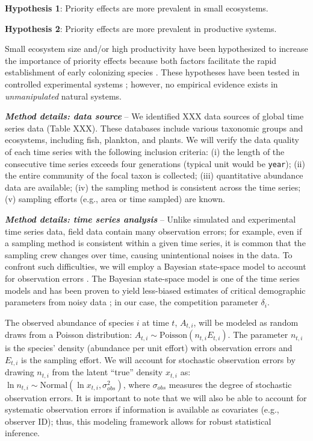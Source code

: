 \documentclass[12pt, class=article, crop=false]{standalone}
\begin{document}
\textbf{Hypothesis 1}: Priority effects are more prevalent in small ecosystems.

\textbf{Hypothesis 2}: Priority effects are more prevalent in productive systems.

Small ecosystem size and/or high productivity have been hypothesized to increase the importance of priority effects because both factors facilitate the rapid establishment of early colonizing species \citep{fukami_historical_2015}.
These hypotheses have been tested in controlled experimental systems \citep{fukami_assembly_2004, chase_stochastic_2010}; however, no empirical evidence exists in \textit{unmanipulated} natural systems.

\textit{\textbf{Method details: data source}} --
We identified XXX data sources of global time series data (Table XXX).
These databases include various taxonomic groups and ecosystems, including fish, plankton, and plants.
We will verify the data quality of each time series with the following inclusion criteria: (i) the length of the consecutive time series exceeds four generations (typical unit would be \texttt{year}); (ii) the entire community of the focal taxon is collected; (iii) quantitative abundance data are available; (iv) the sampling method is consistent across the time series; (v) sampling efforts (e.g., area or time sampled) are known.

\textit{\textbf{Method details: time series analysis}} --
Unlike simulated and experimental time series data, field data contain many observation errors; for example, even if a sampling method is consistent within a given time series, it is common that the sampling crew changes over time, causing unintentional noises in the data.
To confront such difficulties, we will employ a Bayesian state-space model to account for observation errors \citep{kery_bayesian_2012, amano_hierarchical_2012, anderson_black-swan_2017, terui_metapopulation_2018, terui_intentional_2023}.
The Bayesian state-space model is one of the time series models and has been proven to yield less-biased estimates of critical demographic parameters from noisy data \citep{kery_bayesian_2012}; in our case, the competition parameter $\delta_i$.

The observed abundance of species $i$ at time $t$, $A_{t,i}$, will be modeled as random draws from a Poisson distribution: $A_{t,i} \sim \mbox{Poisson}(n_{t,i} E_{t,i}).$
The parameter $n_{t,i}$ is the species' density (abundance per unit effort) with observation errors and $E_{t,i}$ is the sampling effort.
We will account for stochastic observation errors by drawing $n_{t,i}$ from the latent ``true'' density $x_{t,i}$ as: $\ln n_{t,i} \sim \mbox{Normal}(\ln x_{t,i}, \sigma^2_{obs})$, where $\sigma_{obs}$ measures the degree of stochastic observation errors.
It is important to note that we will also be able to account for systematic observation errors if information is available as covariates (e.g., observer ID); thus, this modeling framework allows for robust statistical inference.
\end{document}

